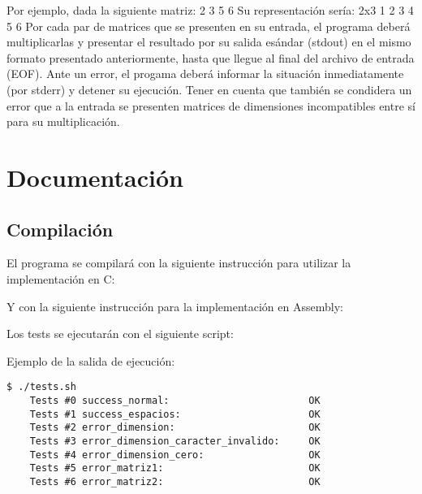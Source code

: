 \documentclass[a4paper,10pt]{article}
\begin{document}
Por ejemplo, dada la siguiente matriz:
 2 3
 5 6
\newline \newline
Su representaci\'on ser\'ia:
\newline
2x3 1 2 3 4 5 6
\newline \newline
Por cada par de matrices que se presenten en su entrada, el programa deber\'a multiplicarlas y presentar el resultado por su salida es\'andar (stdout) en el mismo formato presentado anteriormente, hasta que llegue al final del archivo de entrada (EOF). Ante un error, el progama
deber\'a informar la situaci\'on inmediatamente (por stderr) y detener su ejecuci\'on. Tener en cuenta que tambi\'en se condidera un error que a la entrada se presenten matrices de dimensiones incompatibles entre s\'i para su multiplicaci\'on.



\pagebreak


\section{Documentaci\'on}

\subsection{Compilaci\'on}
El programa se compilar\'a con la siguiente instrucci\'on para utilizar la implementaci\'on en C:
\begin{center} 
\end{center}

Y con la siguiente instrucci\'on para la implementaci\'on en Assembly:
\begin{center} 
\end{center}

Los tests se ejecutar\'an con el siguiente script:
\begin{center} 
\end{center}

Ejemplo de la salida de ejecuci\'on:
\begin{verbatim}
$ ./tests.sh
	Tests #0 success_normal: 						OK
	Tests #1 success_espacios: 						OK
	Tests #2 error_dimension: 						OK
	Tests #3 error_dimension_caracter_invalido: 	OK
	Tests #4 error_dimension_cero: 					OK
	Tests #5 error_matriz1: 						OK
	Tests #6 error_matriz2: 						OK
\end{verbatim}
\end{document}
